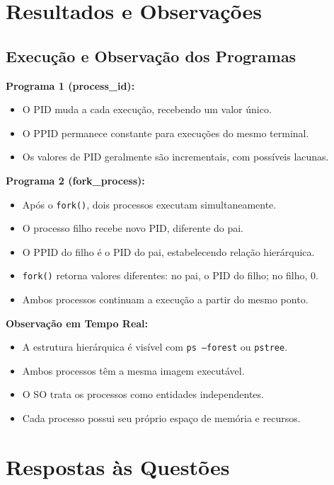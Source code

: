\documentclass[10pt]{article}
\begin{document}
\section{Resultados e Observações}

\subsection{Execução e Observação dos Programas}

\textbf{Programa 1 (process\_id):}
\begin{itemize}\itemsep0em
    \item O PID muda a cada execução, recebendo um valor único.
    \item O PPID permanece constante para execuções do mesmo terminal.
    \item Os valores de PID geralmente são incrementais, com possíveis lacunas.
\end{itemize}

\textbf{Programa 2 (fork\_process):}
\begin{itemize}\itemsep0em
    \item Após o \texttt{fork()}, dois processos executam simultaneamente.
    \item O processo filho recebe novo PID, diferente do pai.
    \item O PPID do filho é o PID do pai, estabelecendo relação hierárquica.
    \item \texttt{fork()} retorna valores diferentes: no pai, o PID do filho; no filho, 0.
    \item Ambos processos continuam a execução a partir do mesmo ponto.
\end{itemize}

\textbf{Observação em Tempo Real:}
\begin{itemize}\itemsep0em
    \item A estrutura hierárquica é visível com \texttt{ps --forest} ou \texttt{pstree}.
    \item Ambos processos têm a mesma imagem executável.
    \item O SO trata os processos como entidades independentes.
    \item Cada processo possui seu próprio espaço de memória e recursos.
\end{itemize}

\section{Respostas às Questões}
\end{document}
